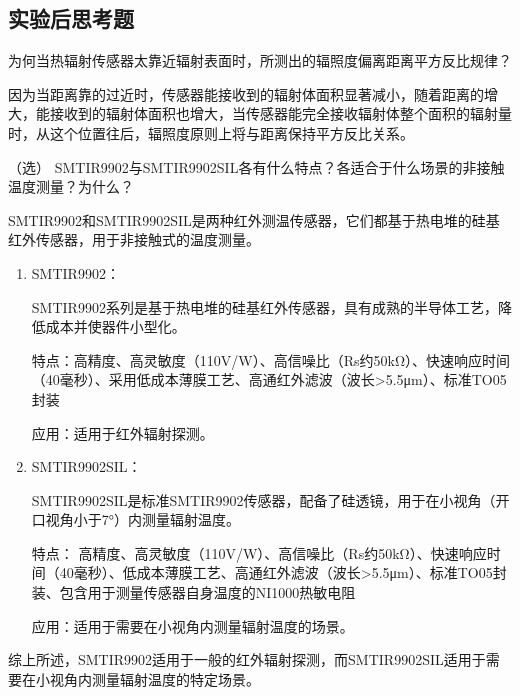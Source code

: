 \documentclass[dvipsnames, svgnames,a4paper,11pt]{article}
\begin{document}
	


			




\subsection{实验后思考题}

\begin{question}
	为何当热辐射传感器太靠近辐射表面时，所测出的辐照度偏离距离平方反比规律？
\end{question}

	因为当距离靠的过近时，传感器能接收到的辐射体面积显著减小，随着距离的增大，能接收到的辐射体面积也增大，当传感器能完全接收辐射体整个面积的辐射量时，从这个位置往后，辐照度原则上将与距离保持平方反比关系。




\begin{question}
	（选） SMTIR9902与SMTIR9902SIL各有什么特点？各适合于什么场景的非接触温度测量？为什么？
\end{question}

	

	SMTIR9902和SMTIR9902SIL是两种红外测温传感器，它们都基于热电堆的硅基红外传感器，用于非接触式的温度测量。

	\begin{enumerate}
		\item SMTIR9902：

		SMTIR9902系列是基于热电堆的硅基红外传感器，具有成熟的半导体工艺，降低成本并使器件小型化。
	
		特点：高精度、高灵敏度（110V/W）、高信噪比（Rs约50kΩ）、快速响应时间（40毫秒）、采用低成本薄膜工艺、高通红外滤波（波长>5.5μm）、标准TO05封装
		
		应用：适用于红外辐射探测。
		\item SMTIR9902SIL：

		SMTIR9902SIL是标准SMTIR9902传感器，配备了硅透镜，用于在小视角（开口视角小于7°）内测量辐射温度。
	
		特点： 高精度、高灵敏度（110V/W）、高信噪比（Rs约50kΩ）、快速响应时间（40毫秒）、低成本薄膜工艺、高通红外滤波（波长>5.5μm）、标准TO05封装、包含用于测量传感器自身温度的NI1000热敏电阻
		
		应用：适用于需要在小视角内测量辐射温度的场景。
	\end{enumerate}

	综上所述，SMTIR9902适用于一般的红外辐射探测，而SMTIR9902SIL适用于需要在小视角内测量辐射温度的特定场景。
\end{document}
